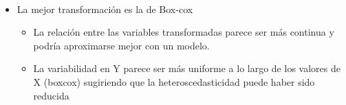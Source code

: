\documentclass[11pt]{article}
\providecommand{\tightlist}{%
      \setlength{\itemsep}{0pt}\setlength{\parskip}{0pt}}
\begin{document}
    \begin{center}
    \end{center}
    { \hspace*{\fill} \\}
    
    \begin{center}
    \end{center}
    { \hspace*{\fill} \\}
    
    \begin{center}
    \end{center}
    { \hspace*{\fill} \\}
    
    \begin{center}
    \end{center}
    { \hspace*{\fill} \\}
    
    \begin{center}
    \end{center}
    { \hspace*{\fill} \\}
    
    \begin{center}
    \end{center}
    { \hspace*{\fill} \\}
    
    \begin{itemize}
\tightlist
\item
  La mejor transformación es la de Box-cox

  \begin{itemize}
  \tightlist
  \item
    La relación entre las variables transformadas parece ser más
    continua y podría aproximarse mejor con un modelo.
  \item
    La variabilidad en Y parece ser más uniforme a lo largo de los
    valores de X (boxcox) sugiriendo que la heteroscedasticidad puede
    haber sido reducida
  \end{itemize}
\end{itemize}
\end{document}
